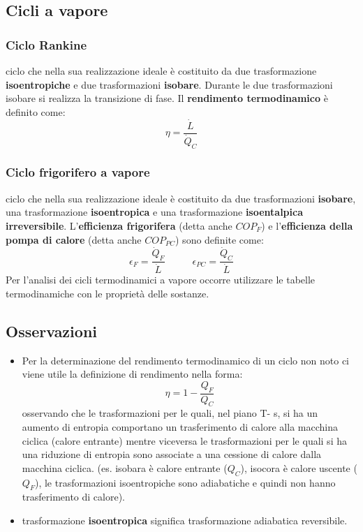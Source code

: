 \subsection{Cicli a vapore}
\subsubsection{Ciclo Rankine}
ciclo che nella sua realizzazione ideale è costituito da due trasformazione
\textbf{isoentropiche} e due trasformazioni \textbf{isobare}. Durante le due trasformazioni isobare si realizza
la transizione di fase. \newline
\newline
Il \textbf{rendimento termodinamico} è definito come:
\[
    \eta = \frac{\dot{L}}{\dot{Q}_C}
\]
\subsubsection{Ciclo frigorifero a vapore}
ciclo che nella sua realizzazione ideale è costituito da due
trasformazioni \textbf{isobare}, una trasformazione \textbf{isoentropica} e una trasformazione \textbf{isoentalpica
irreversibile}. \newline
\newline
L'\textbf{efficienza frigorifera} (detta anche $COP_F$) e l'\textbf{efficienza della pompa di calore} (detta anche $COP_{PC}$) sono definite come:
\[
    \epsilon_F = \frac{\dot{Q}_F}{\dot{L}} \;\;\;\;\;\;\;\;\;\;\epsilon_{PC} = \frac{\dot{Q}_C}{\dot{L}}
\]
Per l'analisi dei cicli termodinamici a vapore occorre utilizzare le tabelle termodinamiche con le proprietà delle sostanze.
\subsection{Osservazioni}
\begin{itemize}
    \item Per la determinazione del rendimento termodinamico di un ciclo non noto ci viene utile la definizione di rendimento nella forma:
    \[
        \eta = 1- \frac{Q_F}{Q_C}
    \]
    osservando che le trasformazioni per le quali, nel piano T- s, si ha un aumento di entropia
    comportano un trasferimento di calore alla macchina ciclica (calore entrante) mentre
    viceversa le trasformazioni per le quali si ha una riduzione di entropia sono associate a una
    cessione di calore dalla macchina ciclica. (es. isobara è calore entrante ($Q_C$), isocora è calore uscente ($Q_F$), le trasformazioni isoentropiche sono adiabatiche e quindi non hanno trasferimento di calore).
    \item  trasformazione \textbf{isoentropica} significa trasformazione adiabatica reversibile.
\end{itemize}
